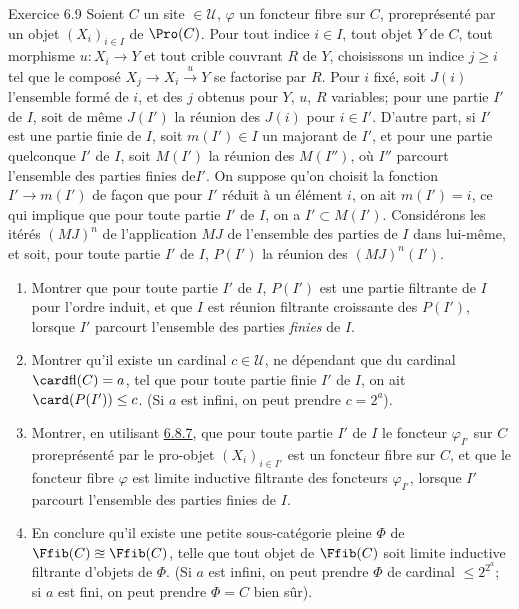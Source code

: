 \documentclass[10pt]{../fichiers-configuration-latex/smfart}
\begin{document}
\begin{enonce*}[remark]{Exercice 6.9}
Soient $C$ un site $\in 𝒰$, $\varphi$ un foncteur fibre sur
$C$, proreprésenté par un objet $(X_i)_{i\in I}$ de $\Pro(C)$. Pour
tout indice $i\in I$, tout objet $Y$ de $C$, tout morphisme
$u:X_i\rightarrow Y$ et tout crible couvrant $R$ de $Y$, choisissons
un indice $j\geq i$ tel que le composé $X_j\rightarrow
X_i\xrightarrow{u}Y$ se factorise par $R$. Pour $i$ fixé, soit
$J(i)$ l'ensemble formé de $i$, et des $j$ obtenus pour $Y$, $u$,
$R$ variables; pour une partie $I'$ de $I$, soit de même $J(I')$ la
réunion des $J(i)$ pour $i\in I'$. D'autre part, si $I'$ est une
partie finie de $I$, soit $m(I')\in I$ un majorant de $I'$, et pour
une partie quelconque $I'$ de $I$, soit $M(I')$ la réunion des
$M(I'')$, où $I''$ parcourt l'ensemble des parties finies
de\pageoriginale $I'$. On suppose qu'on choisit la fonction
$I'\rightarrow m(I')$ de façon que pour $I'$ réduit à un élément
$i$, on ait $m(I')=i$, ce qui implique que pour toute partie $I'$ de
$I$, on a $I'\subset M(I')$. Considérons les itérés $(MJ)^n$ de
l'application $MJ$ de l'ensemble des parties de $I$ dans lui-même,
et soit, pour toute partie $I'$ de $I$, $P(I')$ la réunion des
$(MJ)^n(I')$.
\begin{enumerate}
\renewcommand{\theenumi}{\alph{enumi}}
\renewcommand{\labelenumi}{\theenumi)}
\item Montrer que pour toute partie $I'$ de $I$, $P(I')$ est une
partie filtrante de $I$ pour l'ordre induit, et que $I$ est réunion
filtrante croissante des $P(I')$, lorsque $I'$ parcourt l'ensemble
des parties \emph{finies} de $I$.

\item Montrer qu'il existe un cardinal $c\in 𝒰$, ne dépendant
que du cardinal $\card \text{fl}(C)=a$, tel que pour toute partie
finie $I'$ de $I$, on ait $\card(P(I'))\leq c$. (Si $a$ est infini,
on peut prendre $c=2^{a}$).

\item Montrer, en utilisant \hyperref[IV.subsubsec6.8.7]{6.8.7}, que pour toute partie $I'$ de $I$
le foncteur $\varphi_{I'}$ sur $C$ proreprésenté par le pro-objet
$(X_i)_{i\in I'}$ est un foncteur fibre sur $C$, et que le foncteur
fibre $\varphi$ est limite inductive filtrante des foncteurs
$\varphi_{I'}$, lorsque $I'$ parcourt l'ensemble des parties finies
de $I$.

\item En conclure qu'il existe une petite sous-catégorie pleine $\Phi$
de $\Ffib(C)\approxeq \Ffib(C)$, telle que tout objet de $\Ffib(C)$
soit limite inductive filtrante d'objets de $\Phi$. (Si $a$ est
infini, on peut prendre $\Phi$ de cardinal $\leq 2^{2^{a}}$; si $a$
est fini, on peut prendre $\Phi=C$ bien sûr).
\end{enumerate}
\end{enonce*}
\end{document}
